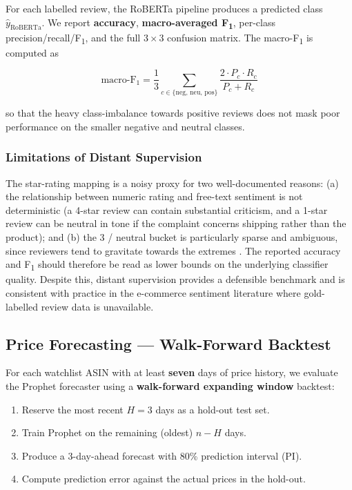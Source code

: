 For each labelled review, the RoBERTa pipeline produces a predicted class
$\hat{y}_{\text{RoBERTa}}$. We report \textbf{accuracy}, \textbf{macro-averaged
F\textsubscript{1}}, per-class precision/recall/F\textsubscript{1}, and the
full $3\times3$ confusion matrix. The macro-F\textsubscript{1} is computed as

\begin{equation}
  \text{macro-F}_1 = \frac{1}{3} \sum_{c \in \{\text{neg, neu, pos}\}}
    \frac{2 \cdot P_c \cdot R_c}{P_c + R_c}
\end{equation}

so that the heavy class-imbalance towards positive reviews does not mask
poor performance on the smaller negative and neutral classes.

\subsubsection{Limitations of Distant Supervision}

The star-rating mapping is a noisy proxy for two well-documented reasons:
(a) the relationship between numeric rating and free-text sentiment is not
deterministic (a 4-star review can contain substantial criticism, and a
1-star review can be neutral in tone if the complaint concerns shipping
rather than the product); and (b) the 3 / neutral bucket is particularly
sparse and ambiguous, since reviewers tend to gravitate towards the
extremes \cite{mcauley2013amateurs}. The reported accuracy and F\textsubscript{1}
should therefore be read as lower bounds on the underlying classifier
quality. Despite this, distant supervision provides a defensible benchmark
and is consistent with practice in the e-commerce sentiment literature where
gold-labelled review data is unavailable.

\subsection{Price Forecasting --- Walk-Forward Backtest}

For each watchlist ASIN with at least \textbf{seven} days of price history,
we evaluate the Prophet forecaster using a \textbf{walk-forward expanding
window} backtest:

\begin{enumerate}
  \item Reserve the most recent $H = 3$ days as a hold-out test set.
  \item Train Prophet on the remaining (oldest) $n - H$ days.
  \item Produce a 3-day-ahead forecast with 80\% prediction interval (PI).
  \item Compute prediction error against the actual prices in the hold-out.
\end{enumerate}

